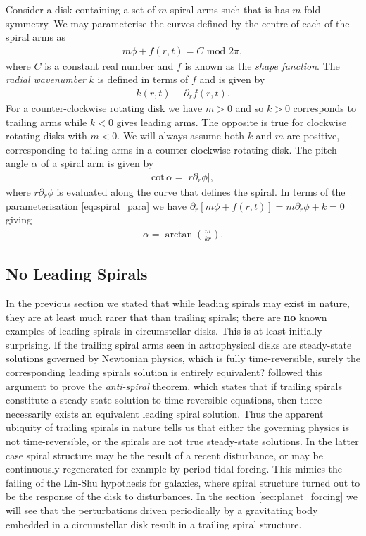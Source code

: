 Consider a disk containing a set of $m$ spiral arms such that is has $m$-fold symmetry. We may parameterise the curves defined by the centre of each of the spiral arms as
\begin{align}
    m\phi + f(r,t) = C \,\, \mathrm{mod} \,\, 2\pi, \label{eq:spiral_para}
\end{align}
where $C$ is a constant real number and $f$ is known as the \textit{shape function}. The \textit{radial wavenumber} $k$ is defined in terms of $f$ and is given by
\begin{align}
    k(r,t) \equiv \partial_r f(r,t).
\end{align}
For a counter-clockwise rotating disk we have $m>0$ and so $k>0$ corresponds to trailing arms while $k<0$ gives leading arms. 
The opposite is true for clockwise rotating disks with $m<0$. 
We will always assume both $k$ and $m$ are positive, corresponding to tailing arms in a counter-clockwise rotating disk. 
The pitch angle $\alpha$ of a spiral arm is given by
\begin{align}
    \mathrm{cot}\,\alpha = \left| r \partial_r \phi \right|,
\end{align}
where $r \partial_r \phi$ is evaluated along the curve that defines the spiral. In terms of the parameterisation \ref{eq:spiral_para} we have $\partial_r[m\phi+f(r,t)] = m \partial_r \phi + k = 0$ giving
\begin{align}
    \alpha = \arctan \left( \frac{m}{kr} \right). \label{eq:pitchangle}
\end{align}

\subsection{No Leading Spirals}

In the previous section we stated that while leading spirals may exist in nature, they are at least much rarer that than trailing spirals; there are \textbf{no} known examples of leading spirals in circumstellar disks.
This is at least initially surprising. 
If the trailing spiral arms seen in astrophysical disks are steady-state solutions governed by Newtonian physics, which is fully time-reversible, surely the corresponding leading spirals solution is entirely equivalent?
\citet{lynden-bell1967} followed this argument to prove the \textit{anti-spiral} theorem, which states that if trailing spirals constitute a steady-state solution to time-reversible equations, then there necessarily exists an equivalent leading spiral solution.
Thus the apparent ubiquity of trailing spirals in nature tells us that either the governing physics is not time-reversible, or the spirals are not true steady-state solutions.
In the latter case spiral structure may be the result of a recent disturbance, or may be continuously regenerated for example by period tidal forcing.
This mimics the failing of the Lin-Shu hypothesis for galaxies, where spiral structure turned out to be the response of the disk to disturbances.
In the section \ref{sec:planet_forcing} we will see that the perturbations driven periodically by a gravitating body embedded in a circumstellar disk result in a trailing spiral structure.

